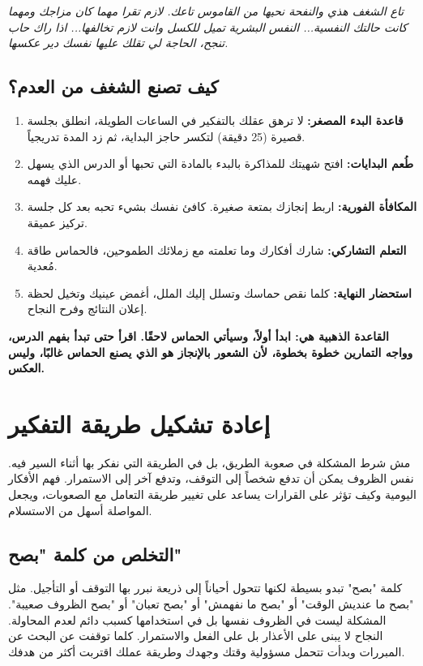 \documentclass[12pt,a4paper]{book}
\newcommand{\quoteAr}[1]{%
	\begin{myquote}
		\itshape #1
	\end{myquote}
}
\newcommand{\importantAr}[1]{%
	\begin{important}
		\bfseries #1
	\end{important}
}
\begin{document}
	\quoteAr{تاع الشغف هذي والنفحة نحيها من القاموس تاعك. لازم تقرا مهما كان مزاجك ومهما كانت حالتك النفسية... النفس البشرية تميل للكسل وانت لازم تخالفها... اذا راك حاب تنجح، الحاجة لي تقلك عليها نفسك دير عكسها.}
	
	\subsection*{كيف تصنع الشغف من العدم؟}
	\begin{enumerate}
		\item \textbf{قاعدة البدء المصغر:} لا ترهق عقلك بالتفكير في الساعات الطويلة، انطلق بجلسة قصيرة (25 دقيقة) لتكسر حاجز البداية، ثم زد المدة تدريجياً.
		\item \textbf{طُعم البدايات:} افتح شهيتك للمذاكرة بالبدء بالمادة التي تحبها أو الدرس الذي يسهل عليك فهمه.
		\item \textbf{المكافأة الفورية:} اربط إنجازك بمتعة صغيرة. كافئ نفسك بشيء تحبه بعد كل جلسة تركيز عميقة.
		\item \textbf{التعلم التشاركي:} شارك أفكارك وما تعلمته مع زملائك الطموحين، فالحماس طاقة مُعدية.
		\item \textbf{استحضار النهاية:} كلما نقص حماسك وتسلل إليك الملل، أغمض عينيك وتخيل لحظة إعلان النتائج وفرح النجاح.
	\end{enumerate}
\importantAr{	 القاعدة الذهبية هي: ابدأ أولاً، وسيأتي الحماس لاحقًا. اقرأ حتى تبدأ بفهم الدرس، وواجه التمارين خطوة بخطوة، لأن الشعور بالإنجاز هو الذي يصنع الحماس غالبًا، وليس العكس.}
	
	\section{إعادة تشكيل طريقة التفكير}
	\label{sec:reframe-mindset}
	مش شرط المشكلة في صعوبة الطريق، بل في الطريقة التي نفكر بها أثناء السير فيه. نفس الظروف يمكن أن تدفع شخصاً إلى التوقف، وتدفع آخر إلى الاستمرار. فهم الأفكار اليومية وكيف تؤثر على القرارات يساعد على تغيير طريقة التعامل مع الصعوبات، ويجعل المواصلة أسهل من الاستسلام.
	
	\subsection{التخلص من كلمة "بصح"}
	
	كلمة "بصح" تبدو بسيطة لكنها تتحول أحياناً إلى ذريعة نبرر بها التوقف أو التأجيل. مثل "بصح ما عنديش الوقت" أو "بصح ما نفهمش" أو "بصح تعبان" أو "بصح الظروف صعيبة". المشكلة ليست في الظروف نفسها بل في استخدامها كسبب دائم لعدم المحاولة. النجاح لا يبنى على الأعذار بل على الفعل والاستمرار. كلما توقفت عن البحث عن المبررات وبدأت تتحمل مسؤولية وقتك وجهدك وطريقة عملك اقتربت أكثر من هدفك.
	
\end{document}
